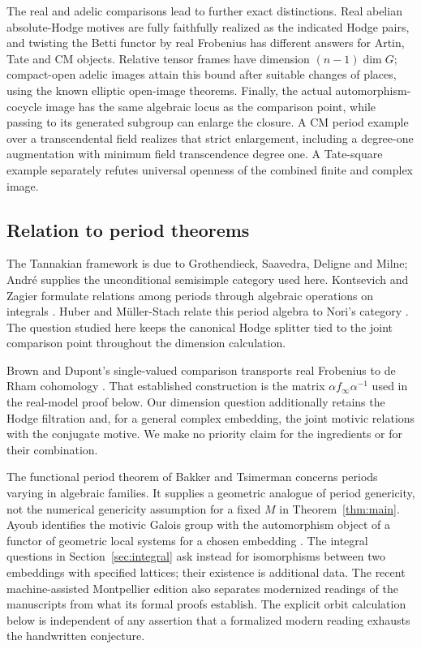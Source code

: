 \documentclass[11pt]{article}
\theoremstyle{definition}\newtheorem{definition}[theorem]{Definition}
\theoremstyle{remark}\newtheorem{remark}[theorem]{Remark}
\begin{document}
The real and adelic comparisons lead to further exact distinctions. Real abelian absolute-Hodge motives are fully faithfully realized as the indicated Hodge pairs, and twisting the Betti functor by real Frobenius has different answers for Artin, Tate and CM objects. Relative tensor frames have dimension $(n-1)\dim G$; compact-open adelic images attain this bound after suitable changes of places, using the known elliptic open-image theorems. Finally, the actual automorphism-cocycle image has the same algebraic locus as the comparison point, while passing to its generated subgroup can enlarge the closure. A CM period example over a transcendental field realizes that strict enlargement, including a degree-one augmentation with minimum field transcendence degree one. A Tate-square example separately refutes universal openness of the combined finite and complex image.

\subsection*{Relation to period theorems}
The Tannakian framework is due to Grothendieck, Saavedra, Deligne and Milne; Andr\'e supplies the unconditional semisimple category used here. Kontsevich and Zagier formulate relations among periods through algebraic operations on integrals \cite[\S1.2 and \S4]{KontsevichZagier}. Huber and M\"uller-Stach relate this period algebra to Nori's category \cite[Theorem 13.1.4, pp.~284--285]{HuberMuellerStach}. The question studied here keeps the canonical Hodge splitter tied to the joint comparison point throughout the dimension calculation.

Brown and Dupont's single-valued comparison transports real Frobenius to de Rham cohomology \cite[Definition 2.6 and Proposition 2.9, pp.~10--11]{BrownDupont}. That established construction is the matrix $\alpha f_\infty\alpha^{-1}$ used in the real-model proof below. Our dimension question additionally retains the Hodge filtration and, for a general complex embedding, the joint motivic relations with the conjugate motive. We make no priority claim for the ingredients or for their combination.

The functional period theorem of Bakker and Tsimerman \cite[Theorem 1.3; Theorem 4.25]{BakkerTsimerman} concerns periods varying in algebraic families. It supplies a geometric analogue of period genericity, not the numerical genericity assumption for a fixed $M$ in Theorem~\ref{thm:main}. Ayoub identifies the motivic Galois group with the automorphism object of a functor of geometric local systems for a chosen embedding \cite[Theorem 4.4.2, p.~234]{Ayoub}. The integral questions in Section~\ref{sec:integral} ask instead for isomorphisms between two embeddings with specified lattices; their existence is additional data. The recent machine-assisted Montpellier edition \cite{Hua} also separates modernized readings of the manuscripts from what its formal proofs establish. The explicit orbit calculation below is independent of any assertion that a formalized modern reading exhausts the handwritten conjecture.
\end{document}
